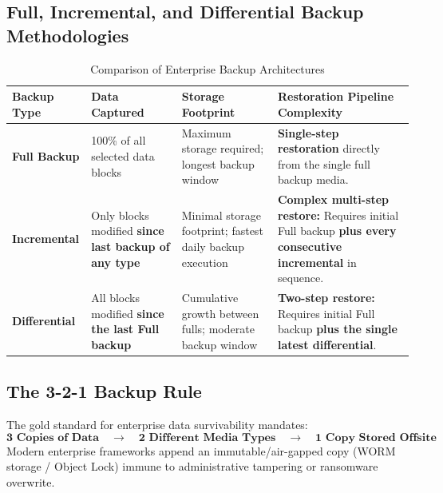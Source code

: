 \subsection{Full, Incremental, and Differential Backup Methodologies}
\begin{table}[htbp]
\centering
\small
\caption{Comparison of Enterprise Backup Architectures}
\label{tab:backup_architectures}
\begin{tabularx}{\textwidth}{l p{3.2cm} p{3.8cm} X}
\toprule
\textbf{Backup Type} & \textbf{Data Captured} & \textbf{Storage Footprint} & \textbf{Restoration Pipeline Complexity} \\
\midrule
\textbf{Full Backup} & 100\% of all selected data blocks & Maximum storage required; longest backup window & \textbf{Single-step restoration} directly from the single full backup media. \\
\textbf{Incremental} & Only blocks modified \textbf{since last backup of any type} & Minimal storage footprint; fastest daily backup execution & \textbf{Complex multi-step restore:} Requires initial Full backup \textbf{plus every consecutive incremental} in sequence. \\
\textbf{Differential} & All blocks modified \textbf{since the last Full backup} & Cumulative growth between fulls; moderate backup window & \textbf{Two-step restore:} Requires initial Full backup \textbf{plus the single latest differential}. \\
\bottomrule
\end{tabularx}
\end{table}

\subsection{The 3-2-1 Backup Rule}
The gold standard for enterprise data survivability mandates:
\begin{equation}
\boxed{\mathbf{3\text{ Copies of Data}} \quad \longrightarrow \quad \mathbf{2\text{ Different Media Types}} \quad \longrightarrow \quad \mathbf{1\text{ Copy Stored Offsite}}}
\end{equation}
Modern enterprise frameworks append an immutable/air-gapped copy (WORM storage / Object Lock) immune to administrative tampering or ransomware overwrite.

